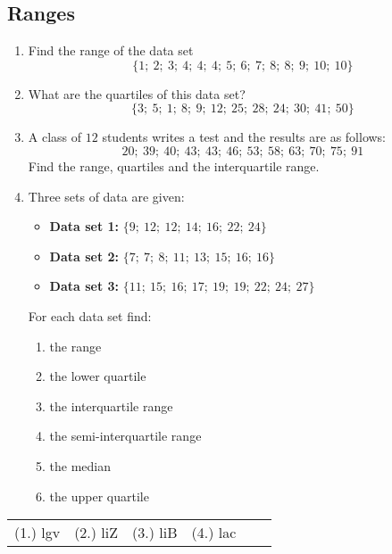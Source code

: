 \subsection{Ranges}
\begin{exercises}{}{
  \begin{enumerate}[noitemsep, label=\textbf{\arabic*}.]
  \item Find the range of the data set
    \begin{equation*}
      \{1;\ 2;\ 3;\ 4;\ 4;\ 4;\ 5;\ 6;\ 7;\ 8;\ 8;\ 9;\ 10;\ 10\}
    \end{equation*}
  \item What are the quartiles of this data set?
    \begin{equation*}
      \{3;\ 5;\ 1;\ 8;\ 9;\ 12;\ 25;\ 28;\ 24;\ 30;\ 41;\ 50\}
    \end{equation*}
  \item A class of $12$ students writes a test and the results are as
    follows:
    \begin{equation*}
      20;\ 39;\ 40;\ 43;\ 43;\ 46;\ 53;\ 58;\ 63;\ 70;\ 75;\ 91
    \end{equation*}
    Find the range, quartiles and the interquartile range.
  \item Three sets of data are given:
    \begin{itemize}  
    \item \textbf{Data set 1:} $\{9;\ 12;\ 12;\ 14;\ 16;\ 22;\ 24\}$
    \item \textbf{Data set 2:} $\{7;\ 7;\ 8;\ 11;\ 13;\ 15;\ 16;\ 16\}$
    \item \textbf{Data set 3:} $\{11;\ 15;\ 16;\ 17;\ 19;\ 19;\ 22;\ 24;\ 27\}$
    \end{itemize}
    For each data set find:
    \begin{enumerate}[noitemsep, label=\textbf{(\alph*)} ]
    \item the range
    \item the lower quartile
    \item the interquartile range
    \item the semi-interquartile range
    \item the median
    \item the upper quartile
    \end{enumerate}
  \end{enumerate}
\practiceinfo
\par 
\par \begin{tabular}[h]{cccccc}
(1.) lgv  &  (2.) liZ  &  (3.) liB  &  (4.) lac  & \end{tabular}
}
\end{exercises}


